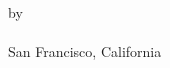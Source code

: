 \documentclass[12pt,oneside]{sfsuthesis}
\theoremstyle{plain} %
\theoremstyle{definition}  %
\theoremstyle{remark}  %
\begin{document}
\thispagestyle{empty}

\[ \]
\vspace{-1.9in}

\begin{center}
{\mytitle}





\vspace{3.1in}

{by \\[12pt] 
\myname \\[12pt]
San Francisco, California\\[12pt]
\thismonth
\thisyear}
\end{center}

\newpage
\textheight=7.1in    %
\footskip=1.1in      %


\end{document}

